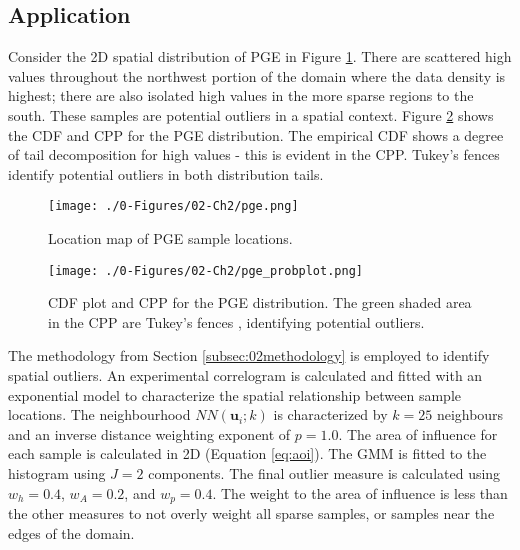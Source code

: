\subsection{Application}
\label{subsec:02application}

Consider the \gls{2D} spatial distribution of \gls{PGE} in Figure \ref{fig:pge}. There are scattered high values throughout the northwest portion of the domain where the data density is highest; there are also isolated high values in the more sparse regions to the south. These samples are potential outliers in a spatial context. Figure \ref{fig:pge_probplot} shows the \gls{CDF} and \gls{CPP} for the \gls{PGE} distribution. The empirical \gls{CDF} shows a degree of tail decomposition for high values - this is evident in the \gls{CPP}. Tukey's fences \citep{tukey1977exploratory} identify potential outliers in both distribution tails.

\begin{figure}[htb!]
    \centering
    \texttt{[image: ./0-Figures/02-Ch2/pge.png]}
    \caption{Location map of \gls{PGE} sample locations. }
    \label{fig:pge}
\end{figure}

\begin{figure}[htb!]
    \centering
    \texttt{[image: ./0-Figures/02-Ch2/pge\_probplot.png]}
    \caption{\Gls{CDF} plot and \gls{CPP} for the \gls{PGE} distribution. The green shaded area in the \gls{CPP} are Tukey's fences \citep{tukey1977exploratory}, identifying potential outliers. }
    \label{fig:pge_probplot}
\end{figure}

The methodology from Section \ref{subsec:02methodology} is employed to identify spatial outliers. An experimental correlogram is calculated and fitted with an exponential model to characterize the spatial relationship between sample locations. The neighbourhood $NN(\mathbf{u}_{i}; k)$ is characterized by $k=25$ neighbours and an inverse distance weighting exponent of $p=1.0$. The area of influence for each sample is calculated in \gls{2D} (Equation \ref{eq:aoi}). The \gls{GMM} is fitted to the histogram using $J=2$ components. The final outlier measure is calculated using $w_{h}=0.4$, $w_{A}=0.2$, and $w_{p}=0.4$. The weight to the area of influence is less than the other measures to not overly weight all sparse samples, or samples near the edges of the domain.

